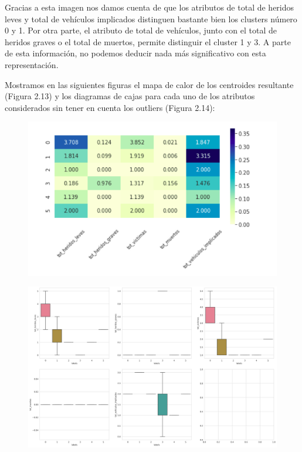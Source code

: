 \documentclass[a4paper,11pt]{book}
\begin{document}
Gracias a esta imagen nos damos cuenta de que los atributos de total de heridos leves y total de vehículos implicados distinguen bastante bien los clusters número 0 y 1. Por otra parte, el atributo de total de vehículos, junto con el total de heridos graves o el total de muertos, permite distinguir el cluster 1 y 3. A parte de esta información, no podemos deducir nada más significativo con esta representación. 

Mostramos en las siguientes figuras el mapa de calor de los centroides resultante (Figura 2.13) y los diagramas de cajas para cada uno de los atributos considerados sin tener en cuenta los outliers (Figura 2.14):
\vspace{3cm}
\begin{figure}
	\centering
	\includegraphics[width=0.9\linewidth]{img/heatmap3}
	\caption{}
	\label{fig:heatmap3}
\end{figure}
\begin{figure}[H]
	\centering
	\includegraphics[width=1.1\linewidth]{img/cajas_cluster3}
	\caption{}
	\label{fig:cajascluster3}
\end{figure}
\end{document}
